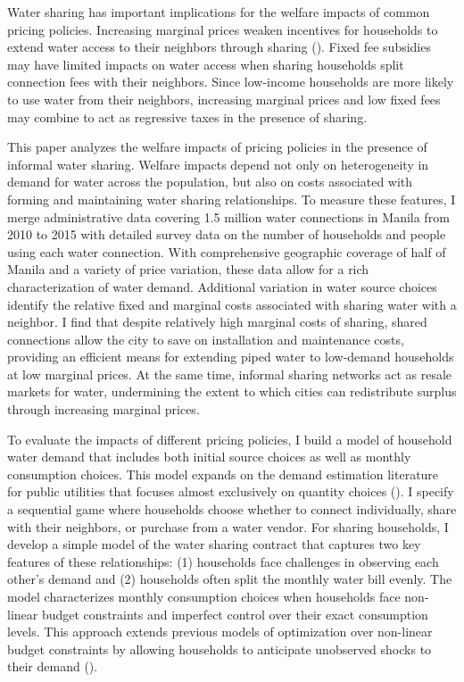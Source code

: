 \documentclass[12pt]{article}
\begin{document}
Water sharing has important implications for the welfare impacts of common pricing policies.  Increasing marginal prices weaken incentives for households to extend water access to their neighbors through sharing (\cite{whittington1992possible}).  Fixed fee subsidies may have limited impacts on water access when sharing households split connection fees with their neighbors.  Since low-income households are more likely to use water from their neighbors, increasing marginal prices and low fixed fees may combine to act as regressive taxes in the presence of sharing.  

This paper analyzes the welfare impacts of pricing policies in the presence of informal water sharing.  Welfare impacts depend not only on heterogeneity in demand for water across the population, but also on costs associated with forming and maintaining water sharing relationships.  To measure these features, I merge administrative data covering 1.5 million water connections in Manila from 2010 to 2015 with detailed survey data on the number of households and people using each water connection.  With comprehensive geographic coverage of half of Manila and a variety of price variation, these data allow for a rich characterization of water demand.  Additional variation in water source choices identify the relative fixed and marginal costs associated with sharing water with a neighbor.  I find that despite relatively high marginal costs of sharing, shared connections allow the city to save on installation and maintenance costs, providing an efficient means for extending piped water to low-demand households at low marginal prices.  At the same time, informal sharing networks act as resale markets for water, undermining the extent to which cities can redistribute surplus through increasing marginal prices.

To evaluate the impacts of different pricing policies, I build a model of household water demand that includes both initial source choices as well as monthly consumption choices.  This model expands on the demand estimation literature for public utilities that focuses almost exclusively on quantity choices (\cite{diakite2009proposal,mcrae2014infrastructure,olmstead2009reduced,szabo2015value}).  I specify a sequential game where households choose whether to connect individually, share with their neighbors, or purchase from a water vendor.  For sharing households, I develop a simple model of the water sharing contract that captures two key features of these relationships: (1) households face challenges in observing each other's demand and (2) households often split the monthly water bill evenly.  The model characterizes monthly consumption choices when households face non-linear budget constraints and imperfect control over their exact consumption levels.  This approach extends previous models of optimization over non-linear budget constraints by allowing households to anticipate unobserved shocks to their demand (\cite{moffitt1986econometrics,burtless1978effect}).
\end{document}

